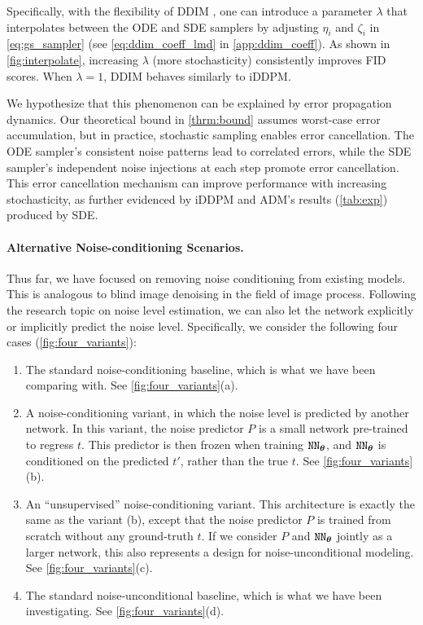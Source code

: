Specifically, with the flexibility of DDIM \cite{song2021ddim}, one can introduce a parameter $\lambda$ that interpolates between the ODE and SDE samplers by adjusting $\eta_i$ and $\zeta_i$ in \cref{eq:gs_sampler} (see \cref{eq:ddim_coeff_lmd} in \cref{app:ddim_coeff}).
As shown in \cref{fig:interpolate}, increasing $\lambda$ (more stochasticity) consistently improves FID scores. When $\lambda=1$, DDIM behaves similarly to iDDPM. 

We hypothesize that this phenomenon can be explained by error propagation dynamics. Our theoretical bound in \cref{thrm:bound} assumes worst-case error accumulation, but in practice, stochastic sampling enables error cancellation. The ODE sampler's consistent noise patterns lead to correlated errors, while the SDE sampler's independent noise injections at each step promote error cancellation. This error cancellation mechanism can improve performance with increasing stochasticity, as further evidenced by iDDPM and ADM's results (\cref{tab:exp}) produced by SDE.

\paragraph{Alternative Noise-conditioning Scenarios.}

Thus far, we have focused on removing noise conditioning from existing models. This is analogous to blind image denoising in the field of image process. Following the research topic on noise level estimation, we can also let the network explicitly or implicitly predict the noise level. Specifically, we consider the following four cases (\cref{fig:four_variants}):

\begin{enumerate}[label=\textbf{(\alph*)},topsep=.5em,itemsep=0pt]
	\item The standard noise-conditioning baseline, which is what we have been comparing with. See \cref{fig:four_variants}(a).
	\item A noise-conditioning variant, in which the noise level is predicted by another network. In this variant, the noise predictor $P$ is a small network pre-trained to regress $t$. This predictor is then frozen when training ${\texttt{NN}}_{{\bm{\theta}}}$, and ${\texttt{NN}}_{{\bm{\theta}}}$ is conditioned on the predicted $t'$, rather than the true $t$. See \cref{fig:four_variants}(b).
	\item An ``unsupervised'' noise-conditioning variant. This architecture is exactly the same as the variant (b), except that the noise predictor $P$ is trained from scratch without any ground-truth $t$. If we consider $P$ and ${\texttt{NN}}_{{\bm{\theta}}}$ jointly as a larger network, this also represents a design for noise-unconditional modeling. See \cref{fig:four_variants}(c).
	\item The standard noise-unconditional baseline, which is what we have been investigating. See \cref{fig:four_variants}(d).
\end{enumerate}

